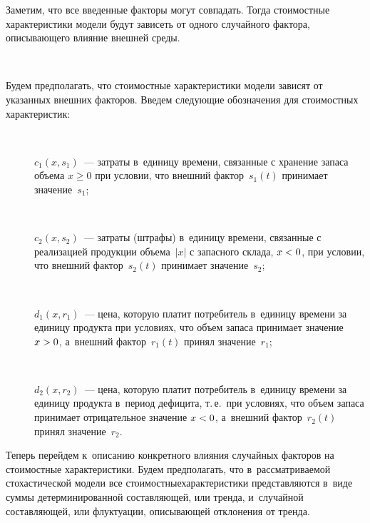 \begin{multicols}{2}
Заметим, что все введенные факторы могут совпадать. Тогда стоимостные 
характеристики модели будут зависеть от одного случайного фактора, описывающего 
влияние внешней среды.

\begin{figure*}[b] %
  \vspace*{1pt}
\begin{center}
   \mbox{%
\epsfxsize=163mm 
}
\end{center}
\vspace*{-9pt}
\end{figure*}

Будем предполагать, что стоимостные характеристики модели зависят от указанных 
внешних факторов. Введем следующие обозначения для стоимостных характеристик:
\begin{description}
\item[\,] $c_1(x,s_1)$~--- затраты в~единицу времени, связанные с хранение запаса объема 
$x\geq0$ при условии, что внешний фактор~$s_1(t)$ принимает значение~$s_1$;
\item[\,] 
$c_2(x,s_2)$~--- затраты (штрафы) в~единицу времени, связанные с реализацией 
продукции объема~$|x|$ с запасного склада, $x\hm<0$, при условии, что внешний 
фактор~$s_2(t)$ принимает значение~$s_2$;
\item[\,] 
$d_1(x,r_1)$~--- цена, которую платит потребитель в~единицу времени за единицу 
продукта при условиях, что объем запаса принимает значение $x\hm>0$, а~внешний 
фактор~$r_1(t)$ принял значение~$r_1$;
\item[\,] 
$d_2(x,r_2)$~--- цена, которую платит потребитель в~единицу времени за единицу 
продукта в~период дефицита, т.\,е.\ при условиях, что объем запаса принимает 
отрицательное значение $x\hm<0$, а~внешний фактор~$r_2(t)$ принял значение~$r_2$.
\end{description}

Теперь перейдем к~описанию конкретного влияния случайных факторов на стоимостные 
характеристики. Будем предполагать, что в~рас\-смат\-ри\-ва\-емой сто\-ха\-сти\-че\-ской модели 
все стоимостные\linebreak \mbox{характеристики} пред\-став\-ля\-ют\-ся в~виде суммы детерминированной 
со\-став\-ля\-ющей, или тренда, и~случайной со\-став\-ля\-ющей, или флуктуации, опи\-сы\-ва\-ющей 
отклонения от тренда.


\end{multicols}
